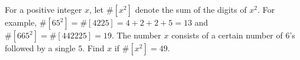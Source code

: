 For a positive integer $x$, let $\#[x^2]$ denote the sum of the digits of $x^2$. For example, $\#[65^2]=\#[4225]=4+2+2+5=13$ and $\#[665^2]=\#[442225]=19$. The number $x$ consists of a certain number of $6$'s followed by a single $5$. Find $x$ if $\#[x^2]=49$.
